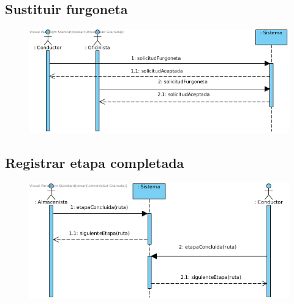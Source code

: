 \subsection{Sustituir furgoneta}
\begin{figure}[H]
	\centering
	\includegraphics[width=16cm]{36}
\end{figure}
\subsection{Registrar etapa completada}
\begin{figure}[H]
	\centering
	\includegraphics[width=16cm]{37}
\end{figure}
